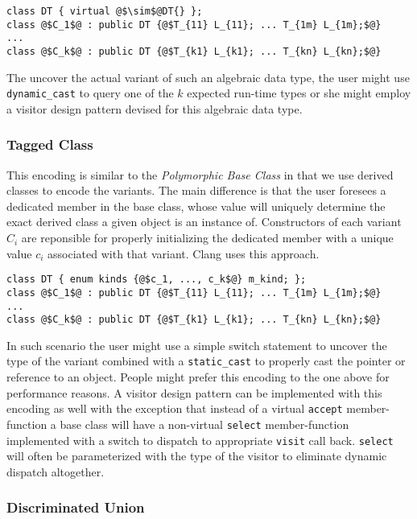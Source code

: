 \documentclass[preprint]{sigplanconf}
\DeclareRobustCommand{\code}[1]{{\lstinline[breaklines=false]{#1}}}
\begin{document}
\begin{lstlisting}[keepspaces,columns=flexible]
class DT { virtual @$\sim$@DT{} };
class @$C_1$@ : public DT {@$T_{11} L_{11}; ... T_{1m} L_{1m};$@} 
...
class @$C_k$@ : public DT {@$T_{k1} L_{k1}; ... T_{kn} L_{kn};$@} 
\end{lstlisting}

The uncover the actual variant of such an algebraic data type, the user might 
use \code{dynamic_cast} to query one of the $k$ expected run-time types or she 
might employ a visitor design pattern devised for this algebraic data type.

\subsubsection{Tagged Class}

This encoding is similar to the \emph{Polymorphic Base Class} in that we use 
derived classes to encode the variants. The main difference is that the user 
foresees a dedicated member in the base class, whose value will uniquely 
determine the exact derived class a given object is an instance of. Constructors 
of each variant $C_i$ are reponsible for properly initializing the dedicated 
member with a unique value $c_i$ associated with that variant. Clang\cite{Clang} 
uses this approach.

\begin{lstlisting}[keepspaces,columns=flexible]
class DT { enum kinds {@$c_1, ..., c_k$@} m_kind; };
class @$C_1$@ : public DT {@$T_{11} L_{11}; ... T_{1m} L_{1m};$@} 
...
class @$C_k$@ : public DT {@$T_{k1} L_{k1}; ... T_{kn} L_{kn};$@} 
\end{lstlisting}

In such scenario the user might use a simple switch statement to uncover the 
type of the variant combined with a \code{static_cast} to properly cast the 
pointer or reference to an object. People might prefer this encoding to the one 
above for performance reasons. A visitor design pattern can be implemented with 
this encoding as well with the exception that instead of a virtual \code{accept} 
member-function a base class will have a non-virtual \code{select} 
member-function implemented with a switch to dispatch to appropriate 
\code{visit} call back. \code{select} will often be parameterized with the type 
of the visitor to eliminate dynamic dispatch altogether.

\subsubsection{Discriminated Union}
\end{document}
